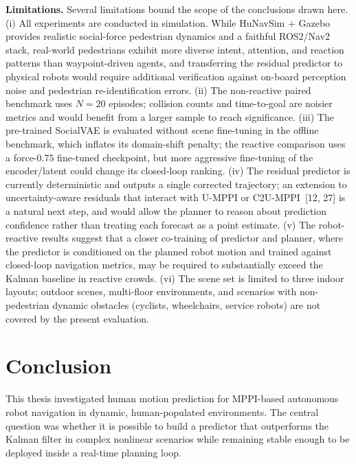\documentclass[12pt, a4paper]{article}
\begin{document}
\textbf{Limitations.} Several limitations bound the scope of the conclusions drawn here. (i) All experiments are conducted in simulation. While HuNavSim + Gazebo provides realistic social-force pedestrian dynamics and a faithful ROS2/Nav2 stack, real-world pedestrians exhibit more diverse intent, attention, and reaction patterns than waypoint-driven agents, and transferring the residual predictor to physical robots would require additional verification against on-board perception noise and pedestrian re-identification errors. (ii) The non-reactive paired benchmark uses $N=20$ episodes; collision counts and time-to-goal are noisier metrics and would benefit from a larger sample to reach significance. (iii) The pre-trained SocialVAE is evaluated without scene fine-tuning in the offline benchmark, which inflates its domain-shift penalty; the reactive comparison uses a force-$0.75$ fine-tuned checkpoint, but more aggressive fine-tuning of the encoder/latent could change its closed-loop ranking. (iv) The residual predictor is currently deterministic and outputs a single corrected trajectory; an extension to uncertainty-aware residuals that interact with U-MPPI or C2U-MPPI~[12, 27] is a natural next step, and would allow the planner to reason about prediction confidence rather than treating each forecast as a point estimate. (v) The robot-reactive results suggest that a closer co-training of predictor and planner, where the predictor is conditioned on the planned robot motion and trained against closed-loop navigation metrics, may be required to substantially exceed the Kalman baseline in reactive crowds. (vi) The scene set is limited to three indoor layouts; outdoor scenes, multi-floor environments, and scenarios with non-pedestrian dynamic obstacles (cyclists, wheelchairs, service robots) are not covered by the present evaluation.

\section{Conclusion}
\label{sec:conclusion}

This thesis investigated human motion prediction for MPPI-based autonomous robot navigation in dynamic, human-populated environments. The central question was whether it is possible to build a predictor that outperforms the Kalman filter in complex nonlinear scenarios while remaining stable enough to be deployed inside a real-time planning loop.
\end{document}
